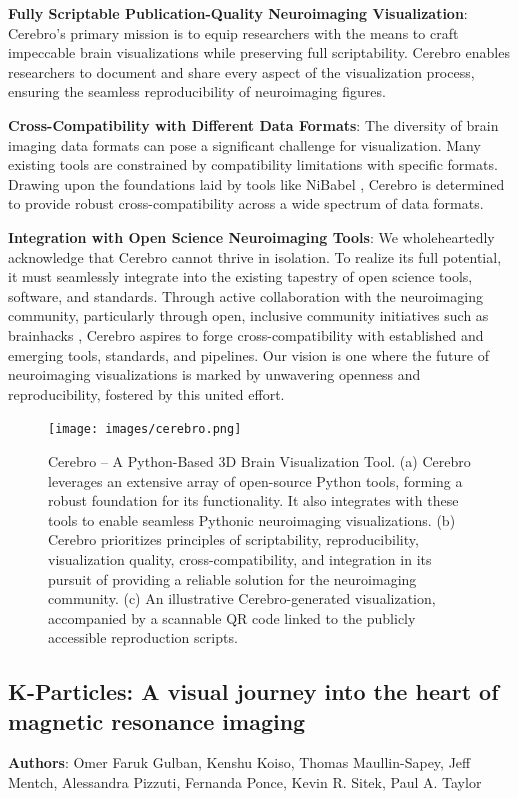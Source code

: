 \documentclass{article}
\begin{document}
\textbf{Fully Scriptable Publication-Quality Neuroimaging Visualization}:
Cerebro's primary mission is to equip researchers with the means to craft impeccable brain visualizations while preserving full scriptability. Cerebro enables researchers to document and share every aspect of the visualization process, ensuring the seamless reproducibility of neuroimaging figures.

\textbf{Cross-Compatibility with Different Data Formats}:
The diversity of brain imaging data formats can pose a significant challenge for visualization. Many existing tools are constrained by compatibility limitations with specific formats. Drawing upon the foundations laid by tools like NiBabel \cite{Brett2020-nx}, Cerebro is determined to provide robust cross-compatibility across a wide spectrum of data formats.

\textbf{Integration with Open Science Neuroimaging Tools}:
We wholeheartedly acknowledge that Cerebro cannot thrive in isolation. To realize its full potential, it must seamlessly integrate into the existing tapestry of open science tools, software, and standards. Through active collaboration with the neuroimaging community, particularly through open, inclusive community initiatives such as brainhacks \cite{gau2021brainhack}, Cerebro aspires to forge cross-compatibility with established and emerging tools, standards, and pipelines. Our vision is one where the future of neuroimaging visualizations is marked by unwavering openness and reproducibility, fostered by this united effort.

\begin{figure}[h]
    \centering
    \texttt{[image: images/cerebro.png]}
    \label{fig:cerebro}
    \caption{
        Cerebro – A Python-Based 3D Brain Visualization Tool. (a) Cerebro leverages an extensive array of open-source Python tools, forming a robust foundation for its functionality. It also integrates with these tools to enable seamless Pythonic neuroimaging visualizations. (b) Cerebro prioritizes principles of scriptability, reproducibility, visualization quality, cross-compatibility, and integration in its pursuit of providing a reliable solution for the neuroimaging community. (c) An illustrative Cerebro-generated visualization, accompanied by a scannable QR code linked to the publicly accessible reproduction scripts.
    }
\end{figure}



\subsection{K-Particles: A visual journey into the heart of magnetic resonance imaging}
\textbf{Authors}: Omer Faruk Gulban, Kenshu Koiso, Thomas Maullin-Sapey, Jeff Mentch, Alessandra Pizzuti, Fernanda Ponce, Kevin R. Sitek, Paul A. Taylor
\end{document}
